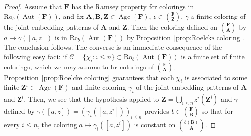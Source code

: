 \documentclass[10pt,a4paper]{article}
\theoremstyle{definition}
\numberwithin{equation}{section}
\numberwithin{figure}{section}
\numberwithin{table}{section}
\newcommand*{\mA}{\mathbf{A}}
\newcommand*{\mB}{\mathbf{B}}
\newcommand*{\mF}{\mathbf{F}}
\newcommand*{\mZ}{\mathbf{Z}}
\DeclareMathOperator{\Aut}{Aut}
\DeclareMathOperator{\Age}{Age}
\newcommand{\ROB}{\mathrm{Ro}_{b}}
\begin{document}
\begin{proof}
Assume that $\mF$ has the Ramsey property for colorings in $\ROB(\Aut(\mF))$, and fix $\mA, \mB, \mZ\in \Age(\mF)$, $z\in \binom{\mF}{\mZ}$, $\gamma$ a finite coloring of the joint embedding patterns of $\mA$ and $\mZ$. Then the coloring defined on $\binom{\mF}{\mA}$ by $a\mapsto \gamma([a,z])$ is in $\ROB(\Aut(\mF))$ by Proposition~\ref{prop:Roelcke coloring}. The conclusion follows. The converse is an immediate consequence of the following easy fact: if $\mathcal C = \{ \chi_{i}:i\leq n\} \subset \ROB(\Aut(\mF))$ is a finite set of finite colorings, which we may assume to be colorings of $\binom{\mF}{\mA}$, Proposition~\ref{prop:Roelcke coloring} guarantees that each $\chi_{i}$ is associated to some finite $\mZ^{i}\subset \Age(\mF)$ and finite coloring $\gamma_{i}$ of the joint embedding patterns of $\mA$ and $\mZ^{i}$. Then, we see that the hypothesis applied to $\mZ=\bigcup_{i\leq n}z^{i}(\mZ^{i})$ and $\gamma$ defined by $\gamma([a,z]) = (\gamma_{i}([a,z^{i}]))_{i\leq n}$ provides $b\in \binom{\mF}{\mB}$ so that for every $i\leq n$, the coloring $a\mapsto \gamma_{i}([a,z^{i}])$ is constant on $\binom{b(\mB)}{\mA}$.
\end{proof}
\end{document}
